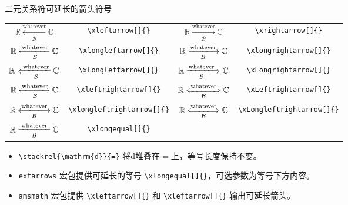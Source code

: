 \documentclass[mathserif]{beamer}
\newcommand{\real}{\mathbb R}
\newcommand{\complex}{\mathbb C}
\newcommand{\md}{\mathrm{d}}
\begin{document}
\begin{frame}[fragile]{二元关系符}{可延长的箭头符号}
\begin{table}[H]
\centering
\begin{tabular}{cc|cc}
	\toprule
	$\real \xleftarrow[\mathcal{B}]{\text{whatever}} \complex$ & \lstinline'\xleftarrow[]{}' & $\real \xrightarrow[\mathcal{B}]{\text{whatever}} \complex$ & \lstinline'\xrightarrow[]{}' \\
	$\real \xlongleftarrow[\mathcal{B}]{\text{whatever}} \complex$ & \lstinline'\xlongleftarrow[]{}' & $\real \xlongrightarrow[\mathcal{B}]{\text{whatever}} \complex$ & \lstinline'\xlongrightarrow[]{}' \\
	$\real \xLongleftarrow[\mathcal{B}]{\text{whatever}} \complex$ & \lstinline'\xLongleftarrow[]{}' & $\real \xLongrightarrow[\mathcal{B}]{\text{whatever}} \complex$ & \lstinline'\xLongrightarrow[]{}' \\
	$\real \xleftrightarrow[\mathcal{B}]{\text{whatever}} \complex$ & \lstinline'\xleftrightarrow[]{}' & $\real \xLeftrightarrow[\mathcal{B}]{\text{whatever}} \complex$ & \lstinline'\xLeftrightarrow[]{}' \\
	$\real \xlongleftrightarrow[\mathcal{B}]{\text{whatever}} \complex$ & \lstinline'\xlongleftrightarrow[]{}' & $\real \xLongleftrightarrow[\mathcal{B}]{\text{whatever}} \complex$ & \lstinline'\xLongleftrightarrow[]{}' \\
	$\real \xlongequal[\mathcal{B}]{\text{whatever}} \complex$ & \lstinline'\xlongequal[]{}' & ~ & ~ \\
	\bottomrule
\end{tabular}
\end{table}
\begin{itemize}

\item \lstinline'\stackrel{\mathrm{d}}{=}' 将$\md$堆叠在$=$上，等号长度保持不变。

\item \verb'extarrows' 宏包提供可延长的等号 \lstinline'\xlongequal[]{}'，可选参数为等号下方内容。

\item \verb'amsmath' 宏包提供 \lstinline'\xleftarrow[]{}' 和 \lstinline'\xleftarrow[]{}' 输出可延长箭头。

\end{itemize}
\end{frame}
\end{document}
